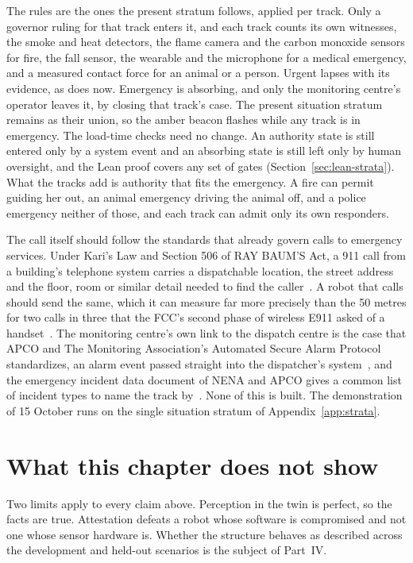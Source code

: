 The rules are the ones the present stratum follows, applied per track. Only a governor ruling for
that track enters it, and each track counts its own witnesses, the smoke and heat detectors, the
flame camera and the carbon monoxide sensors for fire, the fall sensor, the wearable and the
microphone for a medical emergency, and a measured contact force for an animal or a person. Urgent
lapses with its evidence, as  does now. Emergency is absorbing, and only the
monitoring centre's operator leaves it, by closing that track's case. The present situation stratum
remains as their union, so the amber beacon flashes while any track is in emergency. The load-time
checks need no change. An authority state is still entered only by a system event and an absorbing
state is still left only by human oversight, and the Lean proof covers any set of gates
(Section~\ref{sec:lean-strata}). What the tracks add is authority that fits the emergency. A fire
can permit guiding her out, an animal emergency driving the animal off, and a police emergency
neither of those, and each track can admit only its own responders.

The call itself should follow the standards that already govern calls to emergency services. Under
Kari's Law and Section 506 of RAY BAUM'S Act, a 911 call from a building's telephone system carries
a dispatchable location, the street address and the floor, room or similar detail needed to find
the caller~\cite{fcc2019dispatchable}. A robot that calls should send the same, which it can measure
far more precisely than the 50 metres for two calls in three that the FCC's second phase of wireless
E911 asked of a handset~\cite{fcc2001e911phase2}. The monitoring centre's own link to the dispatch
centre is the case that APCO and The Monitoring Association's Automated Secure Alarm Protocol
standardizes, an alarm event passed straight into the dispatcher's system~\cite{apco2021asap}, and
the emergency incident data document of NENA and APCO gives a common list of incident types to name
the track by~\cite{nena2017eidd}. None of this is built. The demonstration of 15 October runs on the
single situation stratum of Appendix~\ref{app:strata}.

\section{What this chapter does not show}\label{sec:cont-limits}

Two limits apply to every claim above. Perception in the twin is perfect, so the facts are true.
Attestation defeats a robot whose software is compromised and not one whose sensor hardware is.
Whether the structure behaves as described across the development and held-out scenarios is the
subject of Part~IV. 
